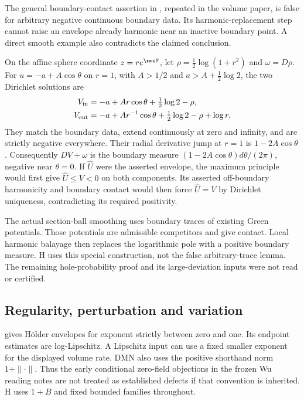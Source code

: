 The general boundary-contact assertion in
\cite[Lemma~2.3]{Wu25HoleProbabilityV1}, repeated in the
volume paper, is false for arbitrary negative continuous
boundary data. Its harmonic-replacement step cannot raise
an envelope already harmonic near an inactive boundary point.
A direct smooth example also contradicts the claimed conclusion.

On the affine sphere coordinate $z=re^{\rmi\theta}$, let
$\rho=\tfrac12\log(1+r^2)$ and $\omega=D\rho$. For
$u=-a+A\cos\theta$ on $r=1$, with $A>1/2$ and
$a>A+\tfrac12\log2$, the two Dirichlet solutions are
\[
 \begin{aligned}
 V_{\rm in}&=-a+Ar\cos\theta+\tfrac12\log2-\rho,\\
 V_{\rm out}&=-a+Ar^{-1}\cos\theta+\tfrac12\log2-\rho+\log r.
 \end{aligned}
\]
They match the boundary data, extend continuously at zero
and infinity, and are strictly negative everywhere.
Their radial derivative jump at $r=1$ is $1-2A\cos\theta$.
Consequently $DV+\omega$ is the boundary measure
$(1-2A\cos\theta)d\theta/(2\pi)$, negative near $\theta=0$.
If $\widehat U$ were the asserted envelope, the maximum
principle would first give $\widehat U\leq V<0$ on both
components. Its asserted off-boundary harmonicity and boundary
contact would then force $\widehat U=V$ by Dirichlet uniqueness,
contradicting its required positivity.

The actual section-ball smoothing uses boundary traces of
existing Green potentials. Those potentials are admissible
competitors and give contact. Local harmonic balayage then
replaces the logarithmic pole with a positive boundary
measure. H uses this special construction, not the false
arbitrary-trace lemma. The remaining hole-probability proof
and its large-deviation inputs were not read or certified.

\subsection{Regularity, perturbation and variation}

\cite[Theorem~2.7]{DMN17FeketePublished} gives H\"older
envelopes for exponent strictly between zero and one. Its
endpoint estimates are log-Lipschitz. A Lipschitz input can
use a fixed smaller exponent for the displayed volume rate.
DMN also uses the positive shorthand norm $1+\|\cdot\|$.
Thus the early conditional zero-field objections in the
frozen Wu reading notes are not treated as established
defects if that convention is inherited. H uses $1+B$ and
fixed bounded families throughout.

